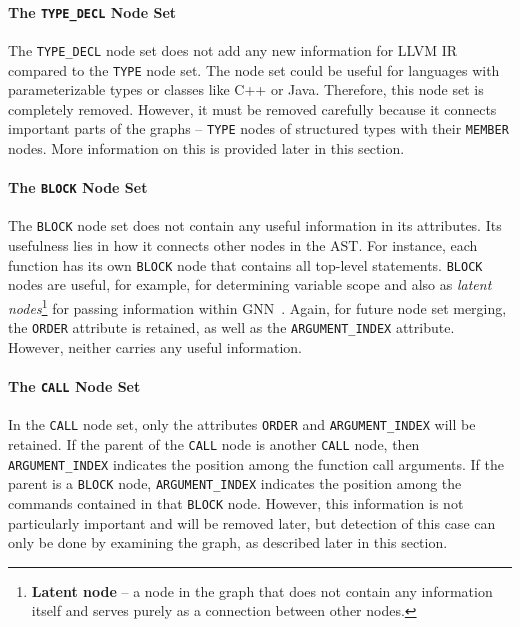\paragraph{The \texttt{TYPE\_DECL} Node Set}
The \texttt{TYPE\_DECL} node set does not add any new information for LLVM IR compared to the \texttt{TYPE} node set. The node set could be useful for languages with parameterizable types or classes like C++ or Java. Therefore, this node set is completely removed. However, it must be removed carefully because it connects important parts of the graphs -- \texttt{TYPE} nodes of structured types with their \texttt{MEMBER} nodes. More information on this is provided later in this section.

\paragraph{The \texttt{BLOCK} Node Set}
The \texttt{BLOCK} node set does not contain any useful information in its attributes. Its usefulness lies in how it connects other nodes in the AST. For instance, each function has its own \texttt{BLOCK} node that contains all top-level statements. \texttt{BLOCK} nodes are useful, for example, for determining variable scope and also as \textit{latent nodes}\footnote{\textbf{Latent node} -- a node in the graph that does not contain any information itself and serves purely as a connection between other nodes.} for passing information within GNN~\cite{tfgnn-data-prep}. Again, for future node set merging, the \texttt{ORDER} attribute is retained, as well as the \texttt{ARGUMENT\_INDEX} attribute. However, neither carries any useful information.

\paragraph{The \texttt{CALL} Node Set}
In the \texttt{CALL} node set, only the attributes \texttt{ORDER} and \texttt{ARGUMENT\_INDEX} will be retained. If the parent of the \texttt{CALL} node is another \texttt{CALL} node, then \texttt{ARGUMENT\_INDEX} indicates the position among the function call arguments. If the parent is a \texttt{BLOCK} node, \texttt{ARGUMENT\_INDEX} indicates the position among the commands contained in that \texttt{BLOCK} node. However, this information is not particularly important and will be removed later, but detection of this case can only be done by examining the graph, as described later in this section.

